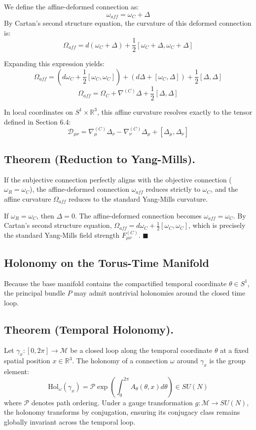 \documentclass[12pt,openany]{book}
\theoremstyle{plain}
\theoremstyle{definition}
\theoremstyle{remark}
\begin{document}
We define the affine-deformed connection as:$$\omega_{aff} = \omega_C + \Delta$$By Cartan's second structure equation, the curvature of this deformed connection is:$$\Omega_{aff} = d(\omega_C + \Delta) + \frac{1}{2}[\omega_C + \Delta, \omega_C + \Delta]$$

Expanding this expression yields:$$\Omega_{aff} = \left( d\omega_C + \frac{1}{2}[\omega_C, \omega_C] \right) + (d\Delta + [\omega_C, \Delta]) + \frac{1}{2}[\Delta, \Delta]$$$$\Omega_{aff} = \Omega_C + \nabla^{(C)}\Delta + \frac{1}{2}[\Delta, \Delta]$$

In local coordinates on $S^1 \times \mathbb{R}^3$, this affine curvature resolves exactly to the tensor defined in Section 6.4:$$\mathcal{D}_{\mu\nu} = \nabla_\mu^{(C)}\Delta_\nu - \nabla_\nu^{(C)}\Delta_\mu + [\Delta_\mu, \Delta_\nu]$$

\subsection{Theorem (Reduction to Yang-Mills).}  If the subjective connection perfectly aligns with the objective connection ($\omega_R = \omega_C$), the affine-deformed connection $\omega_{aff}$ reduces strictly to $\omega_C$, and the affine curvature $\Omega_{aff}$ reduces to the standard Yang-Mills curvature. 

If $\omega_R = \omega_C$, then $\Delta = 0$. The affine-deformed connection becomes $\omega_{aff} = \omega_C$. By Cartan's second structure equation, $\Omega_{aff} = d\omega_C + \frac{1}{2}[\omega_C, \omega_C]$, which is precisely the standard Yang-Mills field strength $F_{\mu\nu}^{(C)}$. $\blacksquare$

\subsection{Holonomy on the Torus-Time Manifold} 
Because the base manifold contains the compactified temporal coordinate $\theta \in S^1$, the principal bundle $P$ may admit nontrivial holonomies around the closed time loop.

\subsection{Theorem (Temporal Holonomy).} Let $\gamma_x: [0, 2\pi] \to \mathcal{M}$ be a closed loop along the temporal coordinate $\theta$ at a fixed spatial position $x \in \mathbb{R}^3$. The holonomy of a connection $\omega$ around $\gamma_x$ is the group element:
$$\text{Hol}_\omega(\gamma_x) = \mathcal{P} \exp \left( \int_0^{2\pi} A_\theta(\theta, x) d\theta \right) \in SU(N)$$where $\mathcal{P}$ denotes path ordering. Under a gauge transformation $g: \mathcal{M} \to SU(N)$, the holonomy transforms by conjugation, ensuring its conjugacy class remains globally invariant across the temporal loop. 
\end{document}
